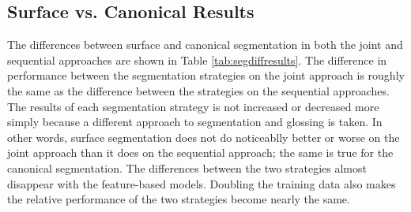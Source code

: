 \subsection{Surface vs. Canonical Results}

The differences between surface and canonical segmentation in both the joint and sequential approaches are shown in Table \ref{tab:segdiffresults}. The difference in performance between the segmentation strategies on the joint approach is roughly the same as the difference between the strategies on the sequential approaches. The results of each segmentation strategy is not increased or decreased more simply because a different approach to segmentation and glossing is taken. In other words, surface segmentation does not do noticeablly better or worse on the joint approach than it does on the sequential approach; the same is true for the canonical segmentation. The differences between the two strategies almost disappear with the feature-based models. Doubling the training data also makes the relative performance of the two strategies become nearly the same.


